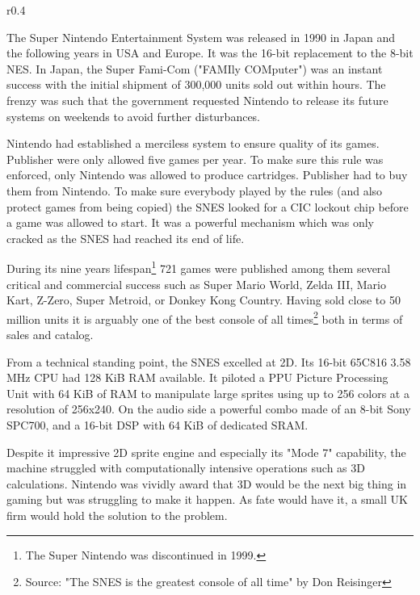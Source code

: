 \begin{wrapfigure}[3]{r}{0.4\textwidth}{
\centering {}}
\end{wrapfigure}
The Super Nintendo Entertainment System was released in 1990 in Japan and the following years in USA and Europe. It was the 16-bit replacement to the 8-bit NES. In Japan, the Super Fami-Com ("FAMIly COMputer") was an instant success with the initial shipment of 300,000 units sold out within hours. The frenzy was such that the government requested Nintendo to release its future systems on weekends to avoid further disturbances.\\
\par
Nintendo had established a merciless system to ensure quality of its games. Publisher were only allowed five games per year. To make sure this rule was enforced, only Nintendo was allowed to produce cartridges. Publisher had to buy them from Nintendo. To make sure everybody played by the rules (and also protect games from being copied) the SNES looked for a CIC lockout chip before a game was allowed to start. It was a powerful mechanism which was only cracked as the SNES had reached its end of life.\\
\par
During its nine years lifespan\footnote{The Super Nintendo was discontinued in 1999.} 721 games were published among them several critical and commercial success such as Super Mario World, Zelda III, Mario Kart, Z-Zero, Super Metroid, or Donkey Kong Country. Having sold close to 50 million units it is arguably one of the best console of all times\footnote{Source: "The SNES is the greatest console of all time" by Don Reisinger} both in terms of sales and catalog.\\
\par
{}
\par
From a technical standing point, the SNES excelled at 2D. Its 16-bit 65C816 3.58 MHz CPU had 128 KiB RAM available. It piloted a PPU Picture Processing Unit with 64 KiB of RAM to manipulate large sprites using up to 256 colors at a resolution of 256x240. On the audio side a powerful combo made of an 8-bit Sony SPC700, and a 16-bit DSP with 64 KiB of dedicated SRAM.\\
\par

Despite it impressive 2D sprite engine and especially its "Mode 7" capability, the machine struggled with computationally intensive operations such as 3D calculations. Nintendo was vividly award that 3D would be the next big thing in gaming but was struggling to make it happen. As fate would have it, a small UK firm would hold the solution to the problem.\\

